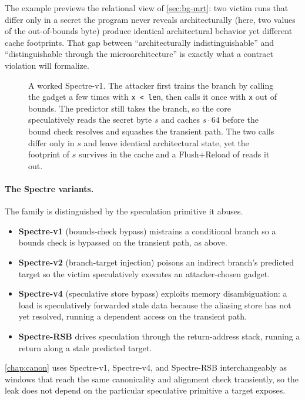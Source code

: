 The example previews the relational view of \autoref{sec:bg-mrt}: two victim runs that differ only
in a secret the program never reveals architecturally (here, two values of the out-of-bounds
byte) produce identical architectural behavior yet different cache footprints. That gap between
``architecturally indistinguishable'' and ``distinguishable through the microarchitecture'' is
exactly what a contract violation will formalize.

\begin{figure}[ht]
\centering
\fitwidth{}
\caption{A worked Spectre-v1. The attacker first trains the branch by calling the gadget a few
times with \texttt{x < len}, then calls it once with \texttt{x} out of bounds. The predictor still
takes the branch, so the core speculatively reads the secret byte $s$ and caches
\reg{arr2[}$s\cdot 64$\reg{]} before the bound check resolves and squashes the transient path. The
two calls differ only in $s$ and leave identical architectural state, yet the footprint of $s$
survives in the cache and a Flush+Reload of  reads it out.}
\label{fig:bg-spectrev1}
\end{figure}

\paragraph{The Spectre variants.}
The family is distinguished by the speculation primitive it abuses.
\begin{itemize}
  \item \textbf{Spectre-v1} (bounds-check bypass) mistrains a conditional branch so a bounds check
    is bypassed on the transient path, as above.
  \item \textbf{Spectre-v2} (branch-target injection) poisons an indirect branch's predicted
    target so the victim speculatively executes an attacker-chosen gadget.
  \item \textbf{Spectre-v4} (speculative store bypass) exploits memory disambiguation: a load is
    speculatively forwarded stale data because the aliasing store has not yet resolved, running a
    dependent access on the transient path.
  \item \textbf{Spectre-RSB} drives speculation through the return-address stack, running a return
    along a stale predicted target.
\end{itemize}
\autoref{chap:canon} uses Spectre-v1, Spectre-v4, and Spectre-RSB interchangeably as windows that
reach the same canonicality and alignment check transiently, so the leak does not depend on the particular
speculative primitive a target exposes.

